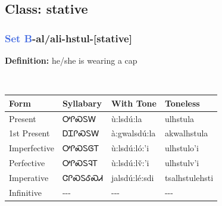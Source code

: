 \subsection*{Class: stative}
\nopagebreak
\needspace{2in}
\subsubsection*{\textcolor{RoyalBlue}{Set B}{-}al/ali{-}\textbf{hstul}{-}[stative]}
\nopagebreak
\textbf{Definition: } he/she is wearing a cap
\\[0.5em]
\begin{tabularx}{\textwidth}{l X X X}%
\toprule%
\textbf{Form}&\textbf{Syllabary}&\textbf{With Tone}&\textbf{Toneless}\\%
\midrule%
Present&ᎤᎵᏍᏚᎳ&ù:lsdú:la&ulhstula\\%
1st Present&ᎠᏆᎵᏍᏚᎳ&à:gwalsdú:la&akwalhstula\\%
Imperfective&ᎤᎵᏍᏚᎶᎢ&ù:lsdú:ló:’i&ulhstulo'i\\%
Perfective&ᎤᎵᏍᏚᎸᎢ&ù:lsdú:lv̌:’i&ulhstulv'i\\%
Imperative&ᏣᎵᏍᏚᎴᏍᏗ&jalsdú:lé:sdi&tsalhstulehsti\\%
Infinitive&{-}{-}{-}&{-}{-}{-}&{-}{-}{-}\\%
\bottomrule%
\end{tabularx}
\\[1em]